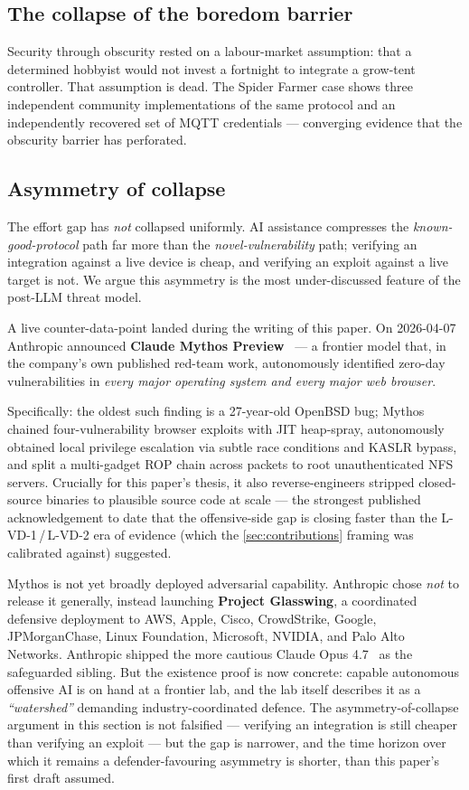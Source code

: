 \documentclass[11pt,a4paper]{article}
\begin{document}
\subsection{The collapse of the boredom barrier}
\label{sec:disc-boredom}
Security through obscurity rested on a labour-market assumption: that a
determined hobbyist would not invest a fortnight to integrate a grow-tent
controller. That assumption is dead. The Spider Farmer case shows three
independent community implementations of the same protocol and an
independently recovered set of MQTT credentials --- converging evidence that
the obscurity barrier has perforated.

\subsection{Asymmetry of collapse}
\label{sec:disc-asymmetry}
The effort gap has \emph{not} collapsed uniformly. AI assistance compresses
the \emph{known-good-protocol} path far more than the
\emph{novel-vulnerability} path; verifying an integration against a live
device is cheap, and verifying an exploit against a live target is not. We
argue this asymmetry is the most under-discussed feature of the post-LLM
threat model.

A live counter-data-point landed during the writing of this paper. On
2026-04-07 Anthropic announced \textbf{Claude Mythos
Preview}~\citep{anthropic2026glasswing,anthropicred2026mythos} ---
a frontier model that, in the company's own published red-team work,
autonomously identified zero-day vulnerabilities in \emph{every major
operating system and every major web browser}.

Specifically: the oldest such finding is a 27-year-old OpenBSD bug;
Mythos chained four-vulnerability browser exploits with JIT
heap-spray, autonomously obtained local privilege escalation via
subtle race conditions and KASLR bypass, and split a multi-gadget ROP
chain across packets to root unauthenticated NFS servers. Crucially
for this paper's thesis, it also reverse-engineers stripped
closed-source binaries to plausible source code at scale --- the
strongest published acknowledgement to date that the offensive-side
gap is closing faster than the L-VD-1\,/\,L-VD-2 era of evidence
(which the \cref{sec:contributions} framing was calibrated against)
suggested.

Mythos is not yet broadly deployed adversarial capability. Anthropic
chose \emph{not} to release it generally, instead launching
\textbf{Project Glasswing}, a coordinated defensive deployment to AWS,
Apple, Cisco, CrowdStrike, Google, JPMorganChase, Linux Foundation,
Microsoft, NVIDIA, and Palo Alto Networks. Anthropic shipped the more
cautious Claude Opus 4.7~\citep{anthropic2026opus47} as the
safeguarded sibling. But the existence proof is now concrete: capable
autonomous offensive AI is on hand at a frontier lab, and the lab
itself describes it as a \emph{``watershed''} demanding
industry-coordinated defence. The asymmetry-of-collapse argument in
this section is not falsified --- verifying an integration is still
cheaper than verifying an exploit --- but the gap is narrower, and
the time horizon over which it remains a defender-favouring
asymmetry is shorter, than this paper's first draft assumed.
\end{document}
